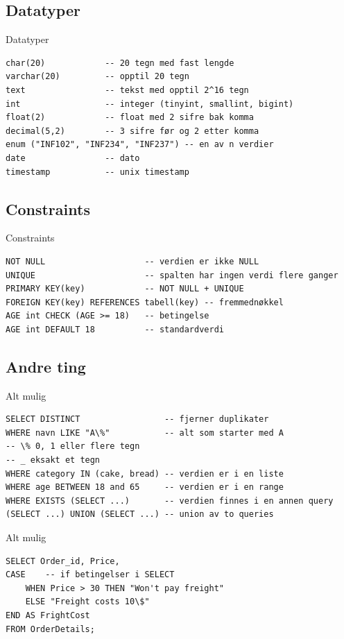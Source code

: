 \subsection*{Datatyper}
\begin{frame}[fragile]{Datatyper}
\begin{verbatim}
char(20)            -- 20 tegn med fast lengde
varchar(20)         -- opptil 20 tegn
text                -- tekst med opptil 2^16 tegn
int                 -- integer (tinyint, smallint, bigint)
float(2)            -- float med 2 sifre bak komma
decimal(5,2)        -- 3 sifre før og 2 etter komma
enum ("INF102", "INF234", "INF237") -- en av n verdier
date                -- dato
timestamp           -- unix timestamp
\end{verbatim}
\end{frame}

\subsection*{Constraints}
\begin{frame}[fragile]{Constraints}
\begin{verbatim}
NOT NULL                    -- verdien er ikke NULL
UNIQUE                      -- spalten har ingen verdi flere ganger
PRIMARY KEY(key)            -- NOT NULL + UNIQUE
FOREIGN KEY(key) REFERENCES tabell(key) -- fremmednøkkel
AGE int CHECK (AGE >= 18)   -- betingelse
AGE int DEFAULT 18          -- standardverdi
\end{verbatim}
\end{frame}

\subsection*{Andre ting}
\begin{frame}[fragile]{Alt mulig}
\begin{verbatim}
SELECT DISTINCT                 -- fjerner duplikater
WHERE navn LIKE "A\%"           -- alt som starter med A
-- \% 0, 1 eller flere tegn
-- _ eksakt et tegn
WHERE category IN (cake, bread) -- verdien er i en liste
WHERE age BETWEEN 18 and 65     -- verdien er i en range
WHERE EXISTS (SELECT ...)       -- verdien finnes i en annen query
(SELECT ...) UNION (SELECT ...) -- union av to queries
\end{verbatim}
\end{frame}

\begin{frame}[fragile]{Alt mulig}
\begin{verbatim}
SELECT Order_id, Price,
CASE    -- if betingelser i SELECT
    WHEN Price > 30 THEN "Won't pay freight"
    ELSE "Freight costs 10\$"
END AS FrightCost
FROM OrderDetails; 
\end{verbatim}
\end{frame}

